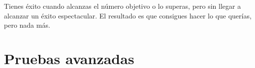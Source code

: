 Tienes éxito cuando alcanzas el número objetivo o lo superas, pero sin llegar a alcanzar un éxito espectacular. El resultado es que consigues hacer lo que querías, pero nada más.









\section{Pruebas avanzadas}



